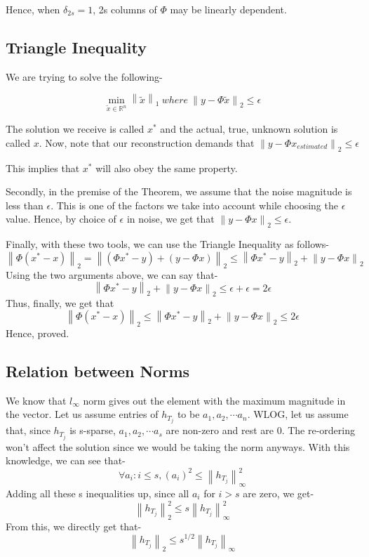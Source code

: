 \documentclass[a4paper,11pt]{article}
\numberwithin{definition}{section}
\numberwithin{mytheorem}{subsection}
\newcommand\norm[1]{\left\lVert#1\right\rVert}
\begin{document}
Hence, when $\delta_{2s}=1$, 2s columns of $\Phi$ may be linearly dependent.

\subsection{Triangle Inequality}

We are trying to solve the following-

$$ \min_{\tilde{x} \in \mathbb{R}^n} \norm{\tilde{x}}_1 ~where ~\norm{y - \Phi \tilde{x}}_2 \leq \epsilon $$

The solution we receive is called $x^*$ and the actual, true, unknown solution is called $x$. Now, note that our reconstruction demands that  $\norm{y - \Phi x_{estimated}}_2 \leq \epsilon$

This implies that $x^*$ will also obey the same property.

Secondly, in the premise of the Theorem, we assume that the noise magnitude is less than $\epsilon$. This is one of the factors we take into account while choosing the $\epsilon$ value. Hence, by choice of $\epsilon$ in noise, we get that
$\norm{y - \Phi x}_2 \leq \epsilon$.

Finally, with these two tools, we can use the Triangle Inequality as follows-
$$\norm{\Phi(x^* - x)}_2 = \norm{(\Phi x^* - y) + (y - \Phi x)}_2 \leq \norm{\Phi x^* - y}_2 + \norm{y-\Phi x}_2$$
Using the two arguments above, we can say that-
$$\norm{\Phi x^* - y}_2 + \norm{y-\Phi x}_2 \leq \epsilon + \epsilon = 2\epsilon$$
Thus, finally, we get that 
$$\norm{\Phi(x^* - x)}_2 \leq \norm{\Phi x^* - y}_2 + \norm{y-\Phi x}_2 \leq 2\epsilon$$
Hence, proved.

\subsection{Relation between Norms}

We know that $l_\infty$ norm gives out the element with the maximum magnitude in the vector. Let us assume entries of $h_{T_j}$ to be $a_1, a_2, \cdots a_n$. WLOG, let us assume that, since $h_{T_j}$ is s-sparse, $a_1, a_2, \cdots a_s$ are non-zero and rest are 0. The re-ordering won't affect the solution since we would be taking the norm anyways.
With this knowledge, we can see that-
$$\forall a_i:i \leq s, (a_i)^2 \leq \norm{h_{T_j}}^2_\infty$$
Adding all these s inequalities up, since all $a_i$ for $i>s$ are zero, we get-
$$\norm{h_{T_j}}_2^2 \leq s \norm{h_{T_j}}_{\infty}^2$$
From this, we directly get that-
$$\norm{h_{T_j}}_2 \leq s^{1/2} \norm{h_{T_j}}_{\infty}$$
\end{document}

